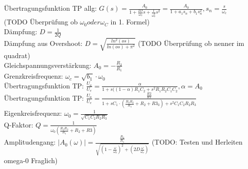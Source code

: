 \documentclass[A4]{scrartcl}
\begin{document}
  Übertragungsfunktion TP allg: $G(s) = \frac{A_0}{1+\frac{2D}{\omega_0}s+\frac{1}{\omega_0^2}s^2} = \frac{A_0}{1+a_1 s_n + b_1 s_n^2},s_n = \frac{s}{\omega_c}$ (TODO Überprüfung ob $\omega_0 oder \omega_C$ in 1. Formel)\\
  Dämpfung: $D = \frac{1}{2Q}$\\
  Dämpfung aus Overshoot: $D = \sqrt{\frac{ln^2(os)}{ln(os)+\pi^2}}$ (TODO Überprüfung ob nenner im quadrat)\\
  Gleichspannungsverstärkung: $A_0 = - \frac{R_2}{R_1}$\\
  Grenzkreisfrequenz: $\omega_c = \sqrt{b_1}\cdot \omega_0$\\
  
  Übertragungsfunktion TP: $\frac{U_a}{U_e} = \frac{\alpha}{1+s((1-\alpha)R_1C_2+s^2R_1R_2C_1C_2}, \alpha = A_0$\\
  
  Übertragungsfunktion TP: $\frac{U_a}{U_e} = \frac{\frac{R2}{R1}}{1+sC_1\cdot (\frac{R_3 R_2}{R_1} + R_2 + R3_3) + s^2C_1C_2R_2R_3 }$\\
  Eigenkreisfrequenz: $\omega_0 = \frac{1}{\sqrt{C_1C_2R_2R_3}}$\\
  Q-Faktor: $Q = \frac{1}{\omega_0 (\frac{R_2R_3}{R_1}+R_2+R3)}$\\
  Amplitudengang: $|A_0(\omega)| = \frac{\frac{R_2}{R_1}}{\sqrt{(1-\frac{\omega}{\omega_0})^2+(2D\frac{\omega}{\omega_o})}}$ (TODO: Testen und Herleiten omega-0 Fraglich)

  
  
\end{document}
